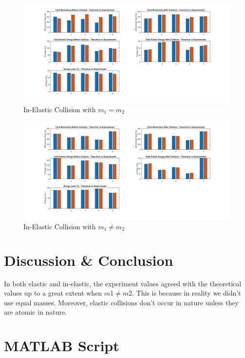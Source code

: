 \newpage
\begin{figure}[h!]
    \centering
    \includegraphics[width=\textwidth]{figures/Exp3.png}
    \caption{In-Elastic Collision with $m_1 = m_2$}
    \label{fig:yx}
\end{figure}
\newpage
\begin{figure}[h!]
    \centering
    \includegraphics[width=\textwidth]{figures/Exp4.png}
    \caption{In-Elastic Collision with $m_1 \neq m_2$}
    \label{fig:yx}
\end{figure}

\section{Discussion \& Conclusion}

In both elastic and in-elastic, the experiment values agreed with the theoretical values up to a great extent when $m1\neq m2$. This is because in reality we didn't use equal masses. Moreover, elastic collisions don't occur in nature unless they are atomic in nature.



\section{MATLAB Script}




